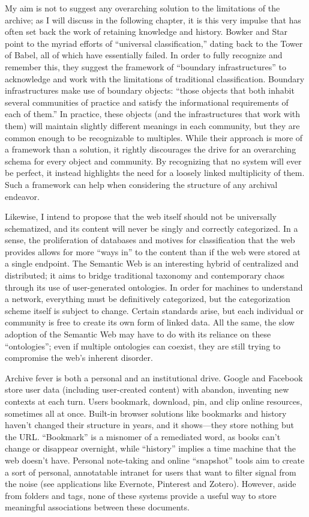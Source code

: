 My aim is not to suggest any overarching solution to the limitations of the archive; as I will discuss in the following chapter, it is this very impulse that has often set back the work of retaining knowledge and history. Bowker and Star point to the myriad efforts of ``universal classification,'' dating back to the Tower of Babel, all of which have essentially failed. In order to fully recognize and remember this, they suggest the framework of ``boundary infrastructures'' to acknowledge and work with the limitations of traditional classification. Boundary infrastructures make use of boundary objects: ``those objects that both inhabit several communities of practice and satisfy the informational requirements of each of them.''\autocite[297]{bowker_sorting_2000} In practice, these objects (and the infrastructures that work with them) will maintain slightly different meanings in each community, but they are common enough to be recognizable to multiples. While their approach is more of a framework than a solution, it rightly discourages the drive for an overarching schema for every object and community. By recognizing that no system will ever be perfect, it instead highlights the need for a loosely linked multiplicity of them. Such a framework can help when considering the structure of any archival endeavor.

Likewise, I intend to propose that the web itself should not be universally schematized, and its content will never be singly and correctly categorized. In a sense, the proliferation of databases and motives for classification that the web provides allows for more ``ways in'' to the content than if the web were stored at a single endpoint. The Semantic Web is an interesting hybrid of centralized and distributed; it aims to bridge traditional taxonomy and contemporary chaos through its use of user-generated ontologies. In order for machines to understand a network, everything must be definitively categorized, but the categorization scheme itself is subject to change. Certain standards arise, but each individual or community is free to create its own form of linked data. All the same, the slow adoption of the Semantic Web may have to do with its reliance on these ``ontologies''; even if multiple ontologies can coexist, they are still trying to compromise the web's inherent disorder.

Archive fever is both a personal and an institutional drive. Google and Facebook store user data (including user-created content) with abandon, inventing new contexts at each turn. Users bookmark, download, pin, and clip online resources, sometimes all at once. Built-in browser solutions like bookmarks and history haven't changed their structure in years, and it shows---they store nothing but the URL. ``Bookmark'' is a misnomer of a remediated word, as books can't change or disappear overnight, while ``history'' implies a time machine that the web doesn't have. Personal note-taking and online ``snapshot'' tools aim to create a sort of personal, annotatable intranet for users that want to filter signal from the noise (see applications like Evernote, Pinterest and Zotero). However, aside from folders and tags, none of these systems provide a useful way to store meaningful associations between these documents.

